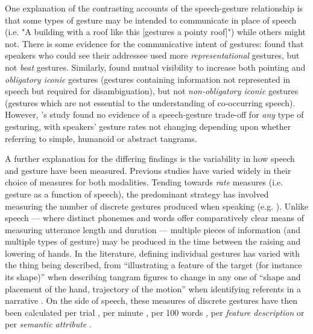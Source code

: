 \documentclass[a4paper,man,natbib]{apa6}
\newcommand*{\term}[1]{\emph{#1}} %
\begin{document}
One explanation of the contrasting accounts of the speech-gesture relationship is that some types of gesture may be intended to communicate in place of speech (i.e. "A building with a roof like this [gestures a pointy roof]") while others might not.
There is some evidence for the communicative intent of gestures: \citet{Alibali2001} found that speakers who could see their addressee used more \term{representational} gestures, but not \term{beat} gestures. 
Similarly, \citet{DeRuiter2012} found mutual visibility to increase both pointing and \term{obligatory iconic} gestures (gestures containing information not represented in speech but required for disambiguation), but not \term{non-obligatory iconic} gestures (gestures which are not essential to the understanding of co-occurring speech).
However, \citeauthor{DeRuiter2012}'s \citeyear{DeRuiter2012} study found no evidence of a speech-gesture trade-off for \emph{any} type of gesturing, with speakers' gesture rates not changing depending upon whether referring to simple, humanoid or abstract tangrams. 


A further explanation for the differing findings is the variability in how speech and gesture have been measured. 
Previous studies have varied widely in their choice of measures for both modalities.
Tending towards \term{rate} measures (i.e. gesture as a function of speech), the predominant strategy has involved measuring the number of discrete gestures produced when speaking (e.g. \citet{Hostetter2007, Gerwing2011, DeRuiter2012, Hoetjes2015}).
Unlike speech --- where distinct phonemes and words offer comparatively clear means of measuring utterance length and duration --- multiple pieces of information (and multiple types of gesture) may be produced in the time between the raising and lowering of hands.
In the literature, defining individual gestures has varied with the thing being described, from ``illustrating a feature of the target (for instance its shape)'' when describing tangram figures \citep{DeRuiter2012} to change in any one of ``shape and placement of the hand, trajectory of the motion'' when identifying referents in a narrative \citep{So2009}.
On the side of speech, these measures of discrete gestures have then been calculated per trial \citep{Morsella2004}, per minute \citep{Mol2011}, per 100 words \citep{Masson-Carro2015, Hostetter2007, Gerwing2011, Hoetjes2015}, per \term{feature description} \citep{DeRuiter2012} or per \term{semantic attribute} \citep{Hoetjes2015}.
\end{document}
